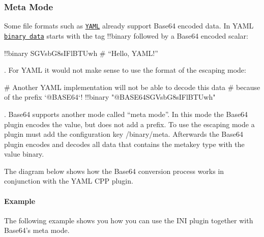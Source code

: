 \hypertarget{autotoc_md52_autotoc_md58}{}\subsubsection{Meta Mode}\label{autotoc_md52_autotoc_md58}
Some file formats such as \href{http://yaml.org}{\tt Y\+A\+ML} already support Base64 encoded data. In Y\+A\+ML \href{http://yaml.org/type/binary.html}{\tt binary data} starts with the tag {\ttfamily !!binary} followed by a Base64 encoded scalar\+:


\begin{DoxyCode}
!!binary SGVsbG8sIFlBTUwh # “Hello, YAML!”
\end{DoxyCode}


. For Y\+A\+ML it would not make sense to use the format of the escaping mode\+:


\begin{DoxyCode}
# Another YAML implementation will not be able to decode this data
# because of the prefix `@BASE64`!
!!binary "@BASE64SGVsbG8sIFlBTUwh"
\end{DoxyCode}


. Base64 supports another mode called “meta mode”. In this mode the Base64 plugin encodes the value, but does not add a prefix. To use the escaping mode a plugin must add the configuration key {\ttfamily /binary/meta}. Afterwards the Base64 plugin encodes and decodes all data that contains the metakey {\ttfamily type} with the value {\ttfamily binary}.

The diagram below shows how the Base64 conversion process works in conjunction with the Y\+A\+ML C\+PP plugin.

\hypertarget{autotoc_md52_autotoc_md59}{}\paragraph{Example}\label{autotoc_md52_autotoc_md59}
The following example shows you how you can use the I\+NI plugin together with Base64’s meta mode.

